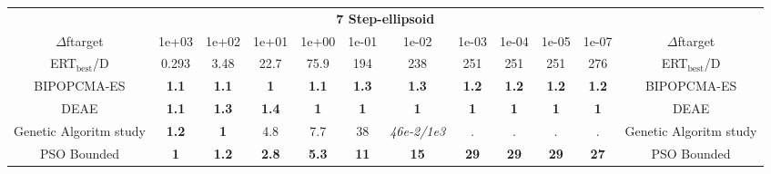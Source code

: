 \begin{tabular}{cccccccccccc}
 & \multicolumn{10}{c}{{\normalsize \textbf{7 Step-ellipsoid}}}\\
$\Delta$ftarget& 1e+03& 1e+02& 1e+01& 1e+00& 1e-01& 1e-02& 1e-03& 1e-04& 1e-05& 1e-07 & $\Delta$ftarget \\
ERT$_{\textrm{best}}$/D& 0.293& 3.48& 22.7& 75.9& 194& 238& 251& 251& 251& 276 & ERT$_{\textrm{best}}$/D \\
\hline
BIPOPCMA-ES & \textbf{1.1} & \textbf{1.1} & \textbf{1} & \textbf{1.1} & \textbf{1.3} & \textbf{1.3} & \textbf{1.2} & \textbf{1.2} & \textbf{1.2} & \textbf{1.2} & BIPOPCMA-ES \cite{add_an_entry_for_BIPOPCMA-ES_in_bbob.bib}\\
DEAE & \textbf{1.1} & \textbf{1.3} & \textbf{1.4} & \textbf{1} & \textbf{1} & \textbf{1} & \textbf{1} & \textbf{1} & \textbf{1} & \textbf{1} & DEAE \cite{add_an_entry_for_DEAE_in_bbob.bib}\\
Genetic Algoritm study & \textbf{1.2} & \textbf{1} & 4.8 & 7.7 & 38 & \textit{46e-2}\textit{/1e3} & . & . & . & . & Genetic Algoritm study \cite{add_an_entry_for_Genetic Algoritm study_in_bbob.bib}\\
PSO Bounded & \textbf{1} & \textbf{1.2} & \textbf{2.8} & \textbf{5.3} & \textbf{11} & \textbf{15} & \textbf{29} & \textbf{29} & \textbf{29} & \textbf{27} & PSO Bounded \cite{add_an_entry_for_PSO Bounded_in_bbob.bib}
\end{tabular}
